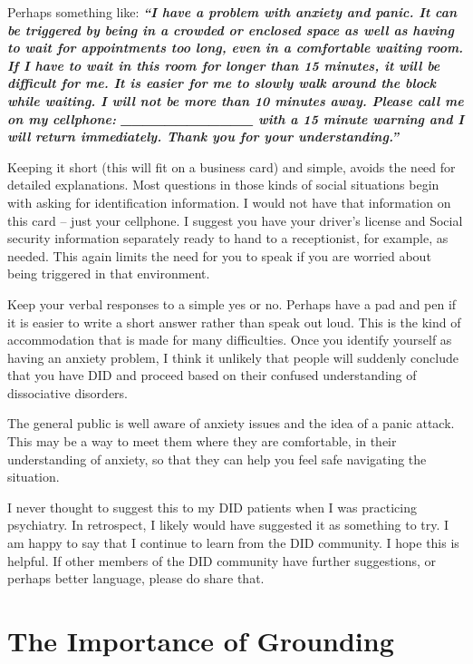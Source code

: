\documentclass[]{book}
\begin{document}
Perhaps something like:
\textbf{\emph{``I have a problem with anxiety and panic. It can be triggered by being in a crowded or enclosed space as well as having to wait for appointments too long, even in a comfortable waiting room. If I have to wait in this room for longer than 15 minutes, it will be difficult for me. It is easier for me to slowly walk around the block while waiting. I will not be more than 10 minutes away. Please call me on my cellphone: \_\_\_\_\_\_\_\_\_\_\_\_ with a 15 minute warning and I will return immediately. Thank you for your understanding.''}}

Keeping it short (this will fit on a business card) and simple, avoids the need for detailed explanations. Most questions in those kinds of social situations begin with asking for identification information. I would not have that information on this card -- just your cellphone. I suggest you have your driver's license and Social security information separately ready to hand to a receptionist, for example, as needed. This again limits the need for you to speak if you are worried about being triggered in that environment.

Keep your verbal responses to a simple yes or no. Perhaps have a pad and pen if it is easier to write a short answer rather than speak out loud. This is the kind of accommodation that is made for many difficulties. Once you identify yourself as having an anxiety problem, I think it unlikely that people will suddenly conclude that you have DID and proceed based on their confused understanding of dissociative disorders.

The general public is well aware of anxiety issues and the idea of a panic attack. This may be a way to meet them where they are comfortable, in their understanding of anxiety, so that they can help you feel safe navigating the situation.

I never thought to suggest this to my DID patients when I was practicing psychiatry. In retrospect, I likely would have suggested it as something to try. I am happy to say that I continue to learn from the DID community. I hope this is helpful. If other members of the DID community have further suggestions, or perhaps better language, please do share that.

\hypertarget{the-importance-of-grounding}{%
\chapter{The Importance of Grounding}\label{the-importance-of-grounding}}
\end{document}
